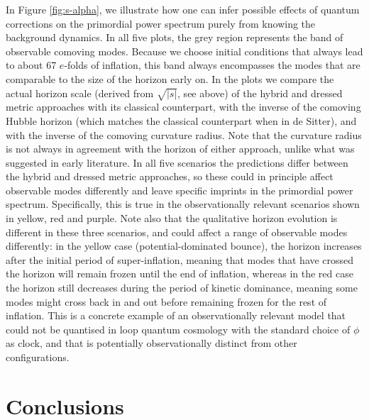 \documentclass[aps,prd,11pt,showkeys,nofootinbib]{revtex4-2}
\begin{document}
In Figure \ref{fig:s-alpha}, we illustrate how one can infer possible effects of quantum corrections on the primordial power spectrum purely from knowing the background dynamics. In all five plots, the grey region represents the band of observable comoving modes. Because we choose initial conditions that always lead to about 67 $e$-folds of inflation, this band always encompasses the modes that are comparable to the size of the horizon early on. In the plots we compare the actual horizon scale (derived from $\sqrt{|s|}$, see above) of the hybrid and dressed metric approaches with its classical counterpart, with the inverse of the comoving Hubble horizon (which matches the classical counterpart when in de Sitter), and with the inverse of the comoving curvature radius. Note that the curvature radius is not always in agreement with the horizon of either approach, unlike what was suggested in early literature. In all five scenarios the predictions differ between the hybrid and dressed metric approaches, so these could in principle affect observable modes differently and leave specific imprints in the primordial power spectrum. Specifically, this is true in the observationally relevant scenarios shown in yellow, red and purple. Note also that the qualitative horizon evolution is different in these three scenarios, and could affect a range of observable modes differently: in the yellow case (potential-dominated bounce), the horizon increases after the initial period of super-inflation, meaning that modes that have crossed the horizon will remain frozen until the end of inflation, whereas in the red case the horizon still decreases during the period of kinetic dominance, meaning some modes might cross back in and out before remaining frozen for the rest of inflation. This is a concrete example of an observationally relevant model that could not be quantised in loop quantum cosmology with the standard choice of $\phi$ as clock, and that is potentially observationally distinct from other configurations. 



\section{Conclusions}
\label{conclsec}
\end{document}
